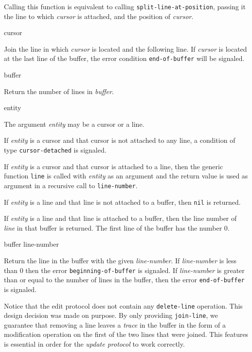 Calling this function is equivalent to calling
\texttt{split-line-at-position}, passing it the line to which
\textit{cursor} is attached, and the position of \textit{cursor}.

\ifdetached{}

 {cursor}

Join the line in which \textit{cursor} is located and the following
line.  If \textit{cursor} is located at the last line of the buffer,
the error condition \texttt{end-of-buffer} will be signaled.

 {buffer}

Return the number of lines in \textit{buffer}.

 {entity}

The argument \textit{entity} may be a cursor or a line.

If \textit{entity} is a cursor and that cursor is not attached to any
line, a condition of type \texttt{cursor-detached} is signaled.

If \textit{entity} is a cursor and that cursor is attached to a line,
then the generic function \texttt{line}  is
called with \textit{entity} as an argument and the return value is
used as argument in a recursive call to \texttt{line-number}.

If \textit{entity} is a line and that line is not attached to a
buffer, then \texttt{nil} is returned.

If \textit{entity} is a line and that line is attached to a buffer,
then the line number of \textit{line} in that buffer is returned.  The
first line of the buffer has the number $0$.

 {buffer line-number}

Return the line in the buffer with the given \textit{line-number}.  If
\textit{line-number} is less than $0$ then the error
\texttt{beginning-of-buffer} is signaled.  If \textit{line-number} is
greater than or equal to the number of lines in the buffer, then the
error \texttt{end-of-buffer} is signaled.

Notice that the edit protocol does not contain any
\texttt{delete-line} operation.  This design decision was made on
purpose.  By only providing \texttt{join-line}, we guarantee that
removing a line leaves a \emph{trace} in the buffer in the form of a
modification operation on the first of the two lines that were
joined.  This features is essential in order for the \emph{update
  protocol} to work correctly.
